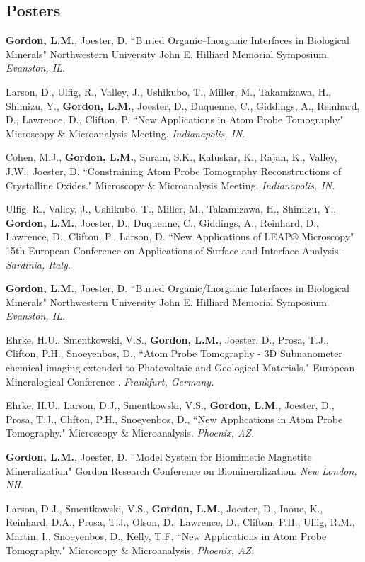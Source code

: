 \subsection*{Posters}
\textbf{Gordon, L.M.}, Joester, D. ``Buried Organic--Inorganic Interfaces in Biological Minerals" Northwestern University John E. Hilliard Memorial Symposium. \emph{Evanston, IL.}

Larson, D., Ulfig, R., Valley, J., Ushikubo, T., Miller, M., Takamizawa, H., Shimizu, Y., \textbf{Gordon, L.M.}, Joester, D., Duquenne, C., Giddings, A., Reinhard, D., Lawrence, D., Clifton, P. ``New Applications in Atom Probe Tomography" Microscopy \& Microanalysis Meeting. \emph{Indianapolis, IN.}

Cohen, M.J., \textbf{Gordon, L.M.}, Suram, S.K., Kaluskar, K., Rajan, K., Valley, J.W., Joester, D. ``Constraining Atom Probe Tomography Reconstructions of Crystalline Oxides." Microscopy \& Microanalysis Meeting. \emph{Indianapolis, IN.}

Ulfig, R., Valley, J., Ushikubo, T., Miller, M., Takamizawa, H., Shimizu, Y., \textbf{Gordon, L.M.}, Joester, D., Duquenne, C., Giddings, A., Reinhard, D., Lawrence, D., Clifton, P., Larson, D. ``New Applications of LEAP® Microscopy" 15th European Conference on Applications of Surface and Interface Analysis. \emph{Sardinia, Italy}.

\textbf{Gordon, L.M.}, Joester, D. ``Buried Organic/Inorganic Interfaces in Biological Minerals" Northwestern University John E. Hilliard Memorial Symposium. \emph{Evanston, IL.}

Ehrke, H.U., Smentkowski, V.S., \textbf{Gordon, L.M.}, Joester, D., Prosa, T.J., Clifton, P.H., Snoeyenbos, D., ``Atom Probe Tomography - 3D Subnanometer chemical imaging extended to Photovoltaic and Geological Materials." European Mineralogical Conference . \emph{Frankfurt, Germany.}

Ehrke, H.U., Larson, D.J., Smentkowski, V.S., \textbf{Gordon, L.M.}, Joester, D., Prosa, T.J., Clifton, P.H., Snoeyenbos, D., ``New Applications in Atom Probe Tomography." Microscopy \& Microanalysis. \emph{Phoenix, AZ.}

\textbf{Gordon, L.M.}, Joester, D. ``Model System for Biomimetic Magnetite Mineralization" Gordon Research Conference on Biomineralization. \emph{New London, NH.}

Larson, D.J., Smentkowski, V.S., \textbf{Gordon, L.M.}, Joester, D., Inoue, K.,  Reinhard, D.A., Prosa, T.J., Olson, D., Lawrence, D., Clifton, P.H., Ulfig, R.M., Martin, I., Snoeyenbos, D., Kelly, T.F. ``New Applications in Atom Probe Tomography." Microscopy \& Microanalysis. \emph{Phoenix, AZ.}

